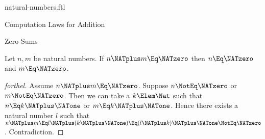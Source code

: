 \documentclass{stex}
\begin{document}
\begin{smodule}{natural-numbers.ftl}
\begin{sfragment}{Computation Laws for Addition}
  \begin{sfragment}{Zero Sums}
    \begin{proposition}[forthel]
      Let $n, m$ be natural numbers.
      If $n \NATplus m \Eq \NATzero$ then $n \Eq \NATzero$ and $m \Eq \NATzero$.
    \end{proposition}
    \begin{proof}[forthel]
      Assume $n \NATplus m \Eq \NATzero$.
      Suppose $n \NotEq \NATzero$ or $m \NotEq \NATzero$.
      Then we can take a $k \Elem \Nat$ such that $n \Eq k \NATplus \NATone$ or $m \Eq k \NATplus \NATone$.
      Hence there exists a natural number $l$ such that
      $n \NATplus m
        \Eq l \NATplus (k \NATplus \NATone)
        \Eq (l \NATplus k) \NATplus \NATone
        \NotEq \NATzero$.
      Contradiction.
    \end{proof}
  \end{sfragment}
\end{sfragment}
\end{smodule}
\end{document}
